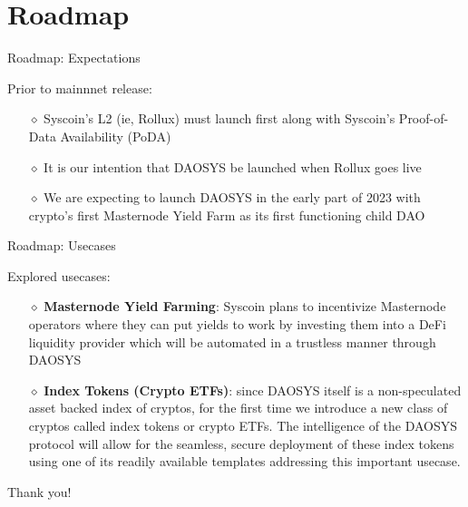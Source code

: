 \documentclass[10pt,xcolor=svgnames]{beamer} %
\begin{document}
\section{Roadmap}

\begin{frame}{Roadmap: Expectations}

Prior to mainnnet release:

\begin{itemize}
  \item[$\diamond$] Syscoin's L2 (ie, Rollux) must launch first along with Syscoin's Proof-of-Data Availability (PoDA)
  \item[$\diamond$] It is our intention that DAOSYS be launched when Rollux goes live
  \item[$\diamond$] We are expecting to launch DAOSYS in the early part of 2023 with crypto's first Masternode Yield Farm as its first functioning child DAO
\end{itemize} 

\end{frame}


\begin{frame}{Roadmap: Usecases}

Explored usecases:

\begin{itemize}
  \item[$\diamond$] \textbf{Masternode Yield Farming}: Syscoin plans to incentivize Masternode operators where they can put yields to work by investing them into a DeFi liquidity provider which will be automated in a trustless manner through DAOSYS
  \item[$\diamond$] \textbf{Index Tokens (Crypto ETFs)}: since DAOSYS itself is a non-speculated asset backed index of cryptos, for the first time we introduce a new class of cryptos called index tokens or crypto ETFs. The intelligence of the DAOSYS protocol will allow for the seamless, secure deployment of these index tokens using one of its readily available templates addressing this important usecase.
\end{itemize} 

\end{frame}



\begin{frame}[standout]
  Thank you! 
\end{frame}
\end{document}
